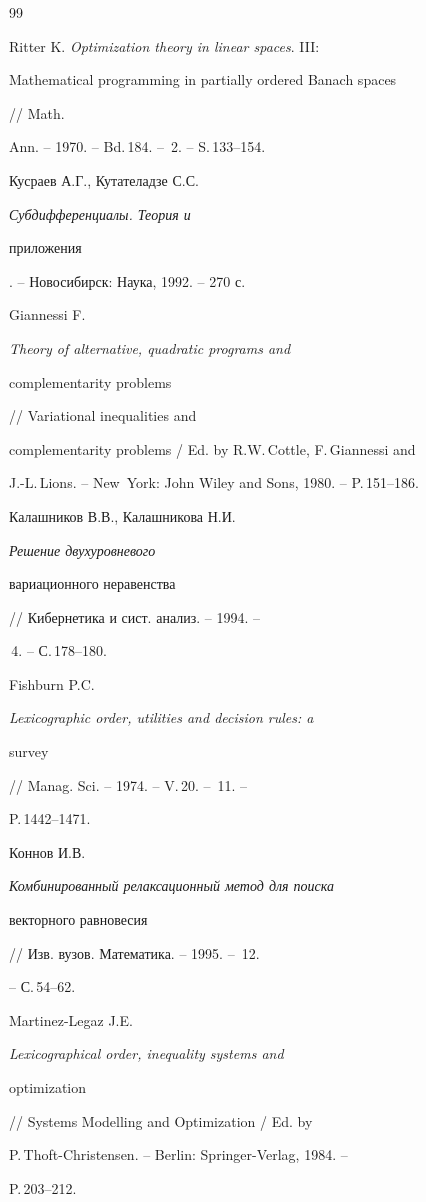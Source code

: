 \begin{thebibliography}{99}


Ritter K. {\em Optimization theory in linear spaces}. III: {\em


Mathematical programming in partially ordered Banach spaces} // Math.


Ann. -- 1970. -- Bd.\,184. -- \No\,2. -- S.\,133--154.




Кусраев А.Г., Кутателадзе С.С. {\em Субдифференциалы. Теория и


приложения}. -- Новосибирск: Наука, 1992. -- 270 с.




Giannessi F. {\em Theory of alternative, quadratic programs and


complementarity problems} // Variational inequalities and


complementarity problems / Ed. by R.W.\,Cottle, F.\,Giannessi and


J.-L.\,Lions. -- New~York: John Wiley and Sons, 1980. -- P.\,151--186.




Калашников В.В., Калашникова Н.И. {\em Решение двухуровневого


вариационного неравенства} // Кибернетика и сист. анализ. -- 1994. --


\No\,4. -- С.\,178--180.




Fishburn P.C. {\em Lexicographic order, utilities and decision rules: a


survey} // Manag. Sci. -- 1974. -- V.\,20. -- \No\,11. --


P.\,1442--1471.




Коннов И.В. {\em Комбинированный релаксационный метод для поиска


векторного равновесия} // Изв. вузов. Математика. -- 1995. -- \No\,12.


-- С.\,54--62.




Martinez-Legaz J.E. {\em Lexicographical order, inequality systems and


optimization} // Systems Modelling and Optimization / Ed. by


P.\,Thoft-Christensen. -- Berlin: Springer-Verlag, 1984. --


P.\,203--212.


\pagebreak





\end{thebibliography}

